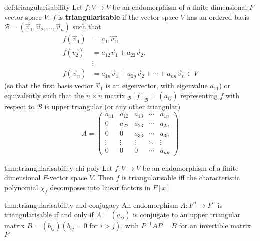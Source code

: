 \documentclass{article}
\begin{document}
\begin{dfn}[Triangularisability]{def:triangularisability}{}
    Let $f : V \to V$ be an endomorphism of a finite dimensional $F$-vector space $V$. $f$ is \textbf{triangularisable} if the vector space $V$ has an ordered basis $\mathcal{B} = (\vec{v}_{1}, \vec{v}_{2},\dots,\vec{v}_{n})$ such that
        \begin{align*}
            f(\vec{v}_{1}) &= a_{11}\vec{v_{1}}, \\
            f(\vec{v_{2}}) &= a_{12}\vec{v}_{1} + a_{22}\vec{v}_{2}, \\
            &\vdots \\
            f(\vec{v}_{n}) &= a_{1n}\vec{v}_{1} + a_{2n}\vec{v}_{2} + \cdots + a_{nn}\vec{v}_{n}\in V
        \end{align*}
        (so that the first basis vector $\vec{v}_{1}$ is an eigenvector, with eigenvalue $a_{11}$) or equivalently such that the $n \times n$ matrix $_{\mathcal{B}}[f]_{\mathcal{B}} = (a_{ij})$ representing $f$ with respect to $\mathcal{B}$ is upper triangular (or any other triangular)
        \[A = \begin{pmatrix}
            a_{11}& a_{12}& a_{13}& \cdots & a_{1n} \\
            0& a_{22}& a_{23}& \cdots& a_{2n} \\
            0 & 0& a_{33}& \cdots& a_{3n} \\
            \vdots& \vdots& \vdots& \ddots& \vdots \\
            0 & 0& 0& \cdots& a_{nn}
        \end{pmatrix}\]
\end{dfn}


\begin{thm}{thm:triangularisability-chi-poly}{}
    Let $f : V \to V$ be an endomorphism of a finite dimensional $F$-vector space $V$. Then $f$ is triangularisable iff the characteristic polynomial $\chi_{f}$ decomposes into linear factors in $F[x]$
\end{thm}

\begin{thm}{thm:triangularisability-and-conjugacy}{}
    An endomorphism $A : F^{n} \to F^{n}$ is triangularisable if and only if $A = (a_{ij})$ is conjugate to an upper triangular matrix $B = (b_{ij})(b_{ij} = 0 \text{ for $i > j$})$, with $P^{-1} AP=B$ for an invertible matrix $P$
\end{thm}
\end{document}
